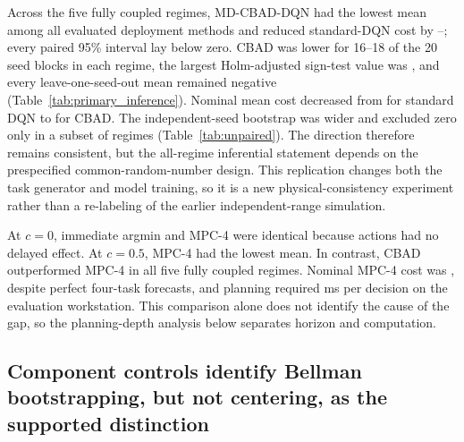 \documentclass[11pt]{article}
\newcommand{\method}{MD-CBAD-DQN\xspace}
\begin{document}
{\color{red}%
Across the five fully coupled regimes, \method had the lowest mean among all evaluated deployment methods and reduced standard-DQN cost by \PhysicalCBADMinPct--\PhysicalCBADMaxPct; every paired 95\% interval lay below zero. CBAD was lower for 16--18 of the 20 seed blocks in each regime, the largest Holm-adjusted sign-test value was \PrimaryHolmPMax, and every leave-one-seed-out mean remained negative (Table~\ref{tab:primary_inference}). Nominal mean cost decreased from \PhysicalNominalDQNCost for standard DQN to \PhysicalNominalCBADCost for CBAD. The independent-seed bootstrap was wider and excluded zero only in a subset of regimes (Table~\ref{tab:unpaired}). The direction therefore remains consistent, but the all-regime inferential statement depends on the prespecified common-random-number design. This replication changes both the task generator and model training, so it is a new physical-consistency experiment rather than a re-labeling of the earlier independent-range simulation.

At $c=0$, immediate argmin and MPC-4 were identical because actions had no delayed effect. At $c=0.5$, MPC-4 had the lowest mean. In contrast, CBAD outperformed MPC-4 in all five fully coupled regimes. Nominal MPC-4 cost was \MPCNominalCost, despite perfect four-task forecasts, and planning required \MPCNominalPlanningMs{} ms per decision on the evaluation workstation. This comparison alone does not identify the cause of the gap, so the planning-depth analysis below separates horizon and computation.

\subsection{Component controls identify Bellman bootstrapping, but not centering, as the supported distinction}

\begin{table}[H]
\centering
\caption{Nominal component and backbone controls. All models use 20 prespecified model-seed blocks, identical real-interaction budgets, and the same held-out traces. Full-action Q applies uncentered Bellman targets; immediate advantage centers analytical immediate costs without bootstrapping. Paired differences are relative to the matched reference named in the third column.}
\label{tab:extended_ablation}
\resizebox{\textwidth}{!}{}
\end{table}

}
\end{document}
